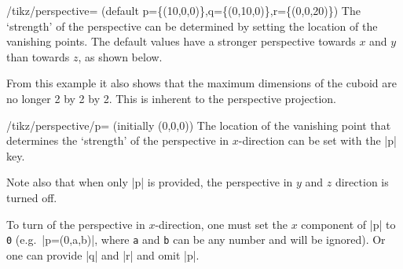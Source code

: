 \begin{key}{/tikz/perspective=
    (default p=\{(10,0,0)\},q=\{(0,10,0)\},r=\{(0,0,20)\})}
  The `strength' of the perspective can be determined by setting the location of
  the vanishing points. The default values have a stronger perspective towards
  $x$ and $y$ than towards $z$, as shown below.
\begin{codeexample}[preamble={\usetikzlibrary{perspective}}]
\end{codeexample}
%
  From this example it also shows that the maximum dimensions of the cuboid are
  no longer 2 by 2 by 2. This is inherent to the perspective projection.
  \begin{key}{/tikz/perspective/p= (initially (0,0,0))}
    The location of the vanishing point that determines the `strength' of the
    perspective in $x$-direction can be set with the |p| key.
\begin{codeexample}[preamble={\usetikzlibrary{perspective}}]
\end{codeexample}
    Note also that when only |p| is provided, the perspective in $y$ and $z$
    direction is turned off.

    To turn of the perspective in $x$-direction, one must set the $x$ component
    of |p| to \texttt{0} (e.g.\ |p={(0,a,b)}|, where \texttt{a} and \texttt{b}
    can be any number and will be ignored). Or one can provide |q| and |r| and
    omit |p|.


\end{key}
\end{key}
